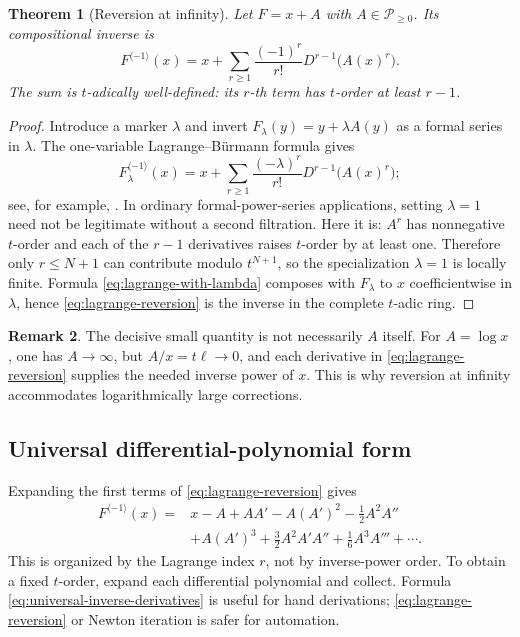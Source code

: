 \documentclass[11pt,oneside]{article}
\numberwithin{equation}{section}
\newtheorem{theorem}{Theorem}[section]
\theoremstyle{definition}
\newtheorem{remark}[theorem]{Remark}
\newcommand{\PL}{\mathscr P}
\newcommand{\rev}{\langle -1\rangle}
\begin{document}
\begin{theorem}[Reversion at infinity]\label{thm:lagrange-reversion}
Let \(F=x+A\) with \(A\in\PL_{\ge0}\).  Its compositional inverse is
\begin{equation}\label{eq:lagrange-reversion}
\boxed{
  F^{\rev}(x)
  =x+\sum_{r\ge1}\frac{(-1)^r}{r!}
       D^{r-1}\bigl(A(x)^r\bigr).
}
\end{equation}
The sum is \(t\)-adically well-defined: its \(r\)-th term has
\(t\)-order at least \(r-1\).
\end{theorem}

\begin{proof}
Introduce a marker \(\lambda\) and invert
\(F_\lambda(y)=y+\lambda A(y)\) as a formal series in \(\lambda\).  The
one-variable Lagrange--B\"urmann formula gives
\begin{equation}\label{eq:lagrange-with-lambda}
  F_\lambda^{\rev}(x)
  =x+\sum_{r\ge1}\frac{(-\lambda)^r}{r!}
       D^{r-1}\bigl(A(x)^r\bigr);
\end{equation}
see, for example, \cite{GesselLagrange}.  In ordinary formal-power-series
applications, setting \(\lambda=1\) need not be legitimate without a second
filtration.  Here it is: \(A^r\) has nonnegative \(t\)-order and each of the
\(r-1\) derivatives raises \(t\)-order by at least one.  Therefore only
\(r\le N+1\) can contribute modulo \(t^{N+1}\), so the specialization
\(\lambda=1\) is locally finite.  Formula \eqref{eq:lagrange-with-lambda}
composes with \(F_\lambda\) to \(x\) coefficientwise in \(\lambda\), hence
\eqref{eq:lagrange-reversion} is the inverse in the complete \(t\)-adic ring.
\end{proof}

\begin{remark}
The decisive small quantity is not necessarily \(A\) itself.  For
\(A=\log x\), one has \(A\to\infty\), but \(A/x=t\ell\to0\), and each derivative
in \eqref{eq:lagrange-reversion} supplies the needed inverse power of \(x\).
This is why reversion at infinity accommodates logarithmically large
corrections.
\end{remark}

\subsection{Universal differential-polynomial form}

Expanding the first terms of \eqref{eq:lagrange-reversion} gives
\begin{align}
 F^{\rev}(x)={}&x-A+AA'
 -A(A')^2-\frac12A^2A''\nonumber\\
 &+A(A')^3+\frac32A^2A'A''+\frac16A^3A'''
 +\cdots.\label{eq:universal-inverse-derivatives}
\end{align}
This is organized by the Lagrange index \(r\), not by inverse-power order.  To
obtain a fixed \(t\)-order, expand each differential polynomial and collect.
Formula \eqref{eq:universal-inverse-derivatives} is useful for hand derivations;
\eqref{eq:lagrange-reversion} or Newton iteration is safer for automation.
\end{document}

